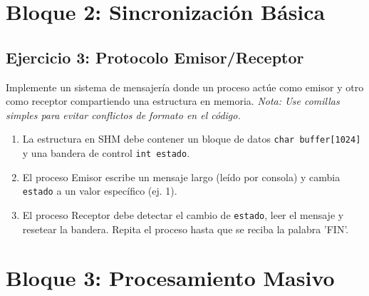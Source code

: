 \documentclass[12pt,a4paper]{article}
\begin{document}
\newpage

\section*{Bloque 2: Sincronización Básica}

\subsection*{Ejercicio 3: Protocolo Emisor/Receptor}
Implemente un sistema de mensajería donde un proceso actúe como emisor y otro como receptor compartiendo una estructura en memoria. \textit{Nota: Use comillas simples para evitar conflictos de formato en el código.}
\begin{enumerate}
    \item La estructura en SHM debe contener un bloque de datos \texttt{char buffer[1024]} y una bandera de control \texttt{int estado}.
    \item El proceso Emisor escribe un mensaje largo (leído por consola) y cambia \texttt{estado} a un valor específico (ej. 1).
    \item El proceso Receptor debe detectar el cambio de \texttt{estado}, leer el mensaje y resetear la bandera. Repita el proceso hasta que se reciba la palabra 'FIN'.
\end{enumerate}

\begin{center}
\end{center}

\newpage

\section*{Bloque 3: Procesamiento Masivo}
\end{document}

